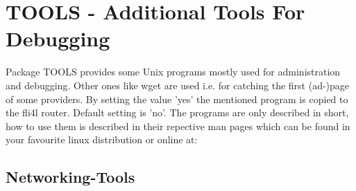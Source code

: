 {
\section{TOOLS - Additional Tools For Debugging}
}

    Package TOOLS provides some Unix programs mostly used for administration
    and debugging. Other ones like wget are used i.e. for catching the first
    (ad-)page of some providers. By setting the value 'yes' the mentioned
    program is copied to the fli4l router. Default setting is 'no'. The programs
    are only described in short, how to use them is described in their repective
    man pages which can be found in your favourite linux distribution or online at:

\subsection{Networking-Tools}

